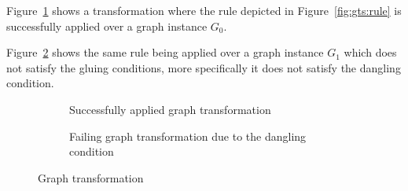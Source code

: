 \begin{example} Figure~\ref{fig:gts:transformation-success} shows a transformation where the rule depicted in Figure~\ref{fig:gts:rule} is successfully applied over a graph instance $G_0$.

  Figure~\ref{fig:gts:transformation-fail} shows the same rule being applied over a graph instance $G_1$ which does not satisfy the gluing conditions, more specifically it does not satisfy the dangling condition.

\begin{figure}[!ht]
  \centering
  \begin{subfigure}[t]{.5\textwidth}
    \centerline{}
    \caption{Successfully applied graph transformation}\label{fig:gts:transformation-success}
  \end{subfigure}

  \begin{subfigure}[t]{.5\textwidth}
    \centerline{}
    \caption{Failing graph transformation due to the dangling condition}\label{fig:gts:transformation-fail}
  \end{subfigure}
  \caption{Graph transformation}\label{fig:gts:transformation}
\end{figure}

\end{example}
